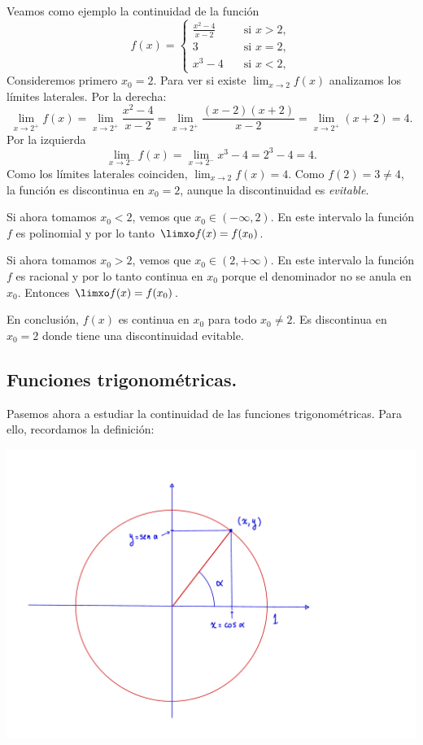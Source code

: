 \begin{example}
    Veamos como ejemplo la continuidad de la función 
    \[
    f(x) = \begin{cases}
        \frac{x^2-4}{x-2} \quad&\text{si }x>2,\\
        3  \quad&\text{si }x=2,\\
        x^3-4  \quad&\text{si }x<2,
    \end{cases}
    \]
    Consideremos primero $x_0=2$. Para ver si existe $\lim_{x\to 2}f(x)$ analizamos los límites laterales.
    Por la derecha:
    \[
    \lim_{x\to 2^+} f(x) 
    = \lim_{x\to 2^+} \frac{x^2-4}{x-2} 
    = \lim_{x\to 2^+} \frac{(x-2)(x+2)}{x-2} 
    = \lim_{x\to 2^+} (x+2) = 4.
    \]
    Por la izquierda
    \[
    \lim_{x\to 2^-} f(x) 
    = \lim_{x\to 2^-} x^3-4
    = 2^3-4
    = 4.
    \]
    Como los límites laterales coinciden, $\lim_{x\to2}f(x) = 4$.
    Como $f(2) = 3\neq 4$, la función es discontinua en $x_0=2$, aunque la discontinuidad es \emph{evitable}.

    Si ahora tomamos $x_0<2$, vemos que $x_0 \in (-\infty,2)$.
    En este intervalo la función $f$ es polinomial y por lo tanto $\limxo f(x) = f(x_0)$.

    Si ahora tomamos $x_0>2$, vemos que $x_0 \in (2,+\infty)$.
    En este intervalo la función $f$ es racional y por lo tanto continua en $x_0$ porque el denominador no se anula en $x_0$. Entonces $\limxo f(x) = f(x_0)$.

    En conclusión, $f(x)$ es continua en $x_0$ para todo $x_0\neq 2$.
    Es discontinua en $x_0=2$ donde tiene una discontinuidad evitable.
\end{example}

\subsection{Funciones trigonométricas.}
Pasemos ahora a estudiar la continuidad de las funciones trigonométricas. Para ello, recordamos la definición:

\centerline{\includegraphics[width=.8\textwidth]{pics/trigonometricas.pdf}}

